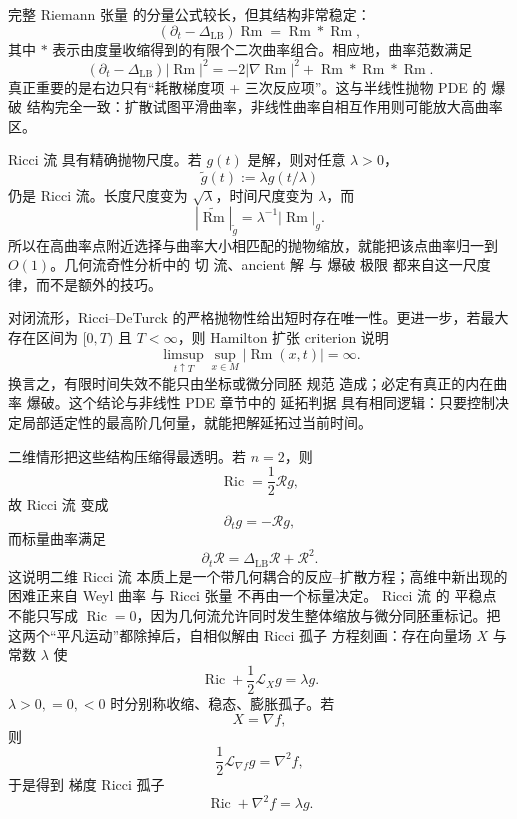 完整 Riemann 张量 的分量公式较长，但其结构非常稳定：
\begin{equation*}{
(\partial_t-\Delta_{\mathrm{LB}})\operatorname{Rm}
=\operatorname{Rm}*\operatorname{Rm},
}\end{equation*}
其中 $*$ 表示由度量收缩得到的有限个二次曲率组合。相应地，曲率范数满足
\begin{equation*}(\partial_t-\Delta_{\mathrm{LB}})|\operatorname{Rm}|^2
=-2|\nabla\operatorname{Rm}|^2+\operatorname{Rm}*\operatorname{Rm}*\operatorname{Rm}.\end{equation*}
真正重要的是右边只有“耗散梯度项 + 三次反应项”。这与半线性抛物 PDE 的 爆破 结构完全一致：扩散试图平滑曲率，非线性曲率自相互作用则可能放大高曲率区。

Ricci 流 具有精确抛物尺度。若 $g(t)$ 是解，则对任意 $\lambda>0$，
\begin{equation*}\widetilde g(t)
:=\lambda g(t/\lambda)\end{equation*}
仍是 Ricci 流。长度尺度变为 $\sqrt\lambda$，时间尺度变为 $\lambda$，而
\[
|\widetilde{\operatorname{Rm}}|_{\widetilde g}
=\lambda^{-1}|\operatorname{Rm}|_g.
\]
所以在高曲率点附近选择与曲率大小相匹配的抛物缩放，就能把该点曲率归一到 $O(1)$。几何流奇性分析中的 切 流、ancient 解 与 爆破 极限 都来自这一尺度律，而不是额外的技巧。

对闭流形，Ricci--DeTurck 的严格抛物性给出短时存在唯一性。更进一步，若最大存在区间为 $[0,T)$ 且 $T<\infty$，则 Hamilton 扩张 criterion 说明
\begin{equation*}{
\limsup_{t\uparrow T}
\sup_{x\in M}|\operatorname{Rm}(x,t)|=\infty.
}\end{equation*}
换言之，有限时间失效不能只由坐标或微分同胚 规范 造成；必定有真正的内在曲率 爆破。这个结论与非线性 PDE 章节中的 延拓判据 具有相同逻辑：只要控制决定局部适定性的最高阶几何量，就能把解延拓过当前时间。

二维情形把这些结构压缩得最透明。若 $n=2$，则
\[
\operatorname{Ric}=\frac12\mathcal R g,
\]
故 Ricci 流 变成
\begin{equation*}\partial_tg=-\mathcal R g,\end{equation*}
而标量曲率满足
\begin{equation*}{
\partial_t\mathcal R
=\Delta_{\mathrm{LB}}\mathcal R+\mathcal R^2.
}\end{equation*}
这说明二维 Ricci 流 本质上是一个带几何耦合的反应--扩散方程；高维中新出现的困难正来自 Weyl 曲率 与 Ricci 张量 不再由一个标量决定。
Ricci 流 的 平稳点 不能只写成 $\operatorname{Ric}=0$，因为几何流允许同时发生整体缩放与微分同胚重标记。把这两个“平凡运动”都除掉后，自相似解由 Ricci 孤子 方程刻画：存在向量场 $X$ 与常数 $\lambda$ 使
\begin{equation}
{
\operatorname{Ric}+\frac12\mathcal L_Xg=\lambda g.
}
\label{eq:math-dg-ricci-soliton}
\end{equation}
$\lambda>0,=0,<0$ 时分别称收缩、稳态、膨胀孤子。若
\[
X=\nabla f,
\]
则
\[
\frac12\mathcal L_{\nabla f}g=\nabla^2f,
\]
于是得到 梯度 Ricci 孤子
\begin{equation}
{
\operatorname{Ric}+\nabla^2f=\lambda g.
}
\label{eq:math-dg-gradient-ricci-soliton}
\end{equation}


